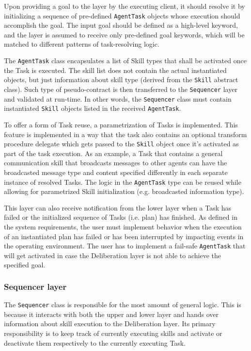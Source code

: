 \documentclass[main.tex]{subfiles}
\begin{document}
Upon providing a goal to the layer by the executing client, it should resolve it by
initializing a sequence of pre-defined \texttt{AgentTask} objects whose execution should 
accomplish the goal. The input goal should be defined 
as a high-level keyword, and the layer is assumed to receive only pre-defined goal keywords,
which will be matched to different patterns of task-resolving logic.

The \texttt{AgentTask} class encapsulates a list of Skill types that shall be activated 
once the Task is executed. The skill list does not contain the actual instantiated 
objects, but just information about skill type (derived from the \texttt{Skill} abstract 
class). Such type of pseudo-contract is then transferred to the \texttt{Sequencer} layer and 
validated at run-time. In other words, the \texttt{Sequencer} class must contain instantiated
\texttt{Skill} objects listed in the received \texttt{AgentTask}.

To offer a form of Task reuse, a parametrization of Tasks is implemented. This feature is 
implemented in a way that the task also contains an optional transform procedure delegate which 
gets passed to the \texttt{Skill} object once it's activated as part of the task execution.
As an example, a Task that contains a general communication skill that broadcasts messages to
other agents can have the broadcasted message type and content specified differently in each 
separate instance of resolved Tasks. The logic in the \texttt{AgentTask} type can be reused 
while allowing for parametrized Skill initialization (e.g. broadcasted information type). 

This layer can also receive notification from the lower layer when a Task has failed or 
the initialized sequence of Tasks (i.e. plan) has finished. As defined in the system requirements, 
the user must implement behavior when the execution of an instantiated plan has failed or 
has been interrupted by impacting events in the operating environment. The user has to implement 
a fail-safe \texttt{AgentTask} that will get activated in case the Deliberation layer is not able 
to achieve the specified goal. 

\subsubsection{Sequencer layer}

The \texttt{Sequencer} class is responsible for the most amount of general logic. This is because 
it interacts with both the upper and lower layer and hands over information about skill execution 
to the Deliberation layer. Its primary responsibility is to keep track of currently executing skills 
and activate or deactivate them respectively to the currently executing Task. 
\end{document}

